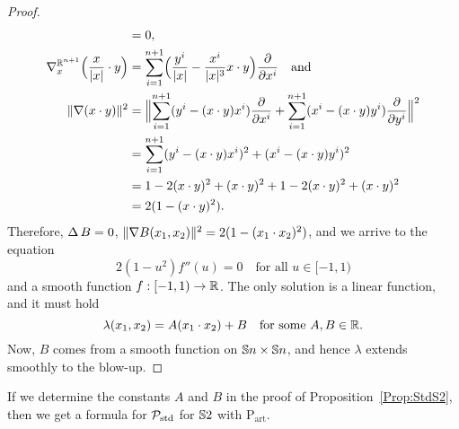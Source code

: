 \documentclass[\MainFolder/Text.tex]{subfiles}
\newcommand{\ArtPrpg}{\mathrm{P}_{\mathrm{art}}}
\begin{document}
\begin{proof}
\begin{align*}
 & = 0,\\
\nabla^{\mathbb{R}^{n+1}}_x\Bigl(\frac{x}{|x|}\cdot y\Bigr) & = \sum_{i=1}^{n+1} \Bigl(\frac{y^i}{|x|} - \frac{x^i}{|x|^3}x\cdot y \Bigr)\frac{\partial}{\partial x^i}\quad\text{and}\\
\| \nabla (x\cdot y) \|^2 &= \Bigl\|\sum_{i=1}^{n+1}(y^i - (x\cdot y) x^i) \frac{\partial}{\partial x^i} + \sum_{i=1}^{n+1}(x^i - (x\cdot y) y^i) \frac{\partial}{\partial y^i}\Bigr\|^2 \\
& = \sum_{i=1}^{n+1} (y^i - (x\cdot y) x^i)^2 + (x^i - (x\cdot y)y^i)^2 \\
& = 1 - 2(x\cdot y)^2 + (x\cdot y)^2 + 1 - 2(x\cdot y)^2 + (x\cdot y)^2 \\
& = 2(1- (x\cdot y)^2).
\end{align*}
Therefore, $\operatorname{\Delta} B = 0$, $\| \nabla B(x_1,x_2) \|^2=2(1-(x_1\cdot x_2)^2)$, and we arrive to the equation
$$ 2(1-u^2) f''(u) = 0\quad \text{for all }u\in[-1,1) $$
and a smooth function $f: [-1,1) \rightarrow \mathbb{R}$. The only solution is a linear function, and it must hold
$$ \lambda(x_1,x_2) = A(x_1 \cdot x_2) + B \quad\text{for some }A, B\in \mathbb{R}. $$
Now, $B$ comes from a smooth function on $\mathbb{S}{n}\times \mathbb{S}{n}$, and hence $\lambda$ extends smoothly to the blow-up.
\end{proof}

If we determine the constants $A$ and $B$ in the proof of Proposition~\ref{Prop:StdS2}, then we get a formula for $\mathcal{P}_{\mathrm{std}}$ for $\mathbb{S}{2}$ with $\ArtPrpg$.

%
%
\end{document}
